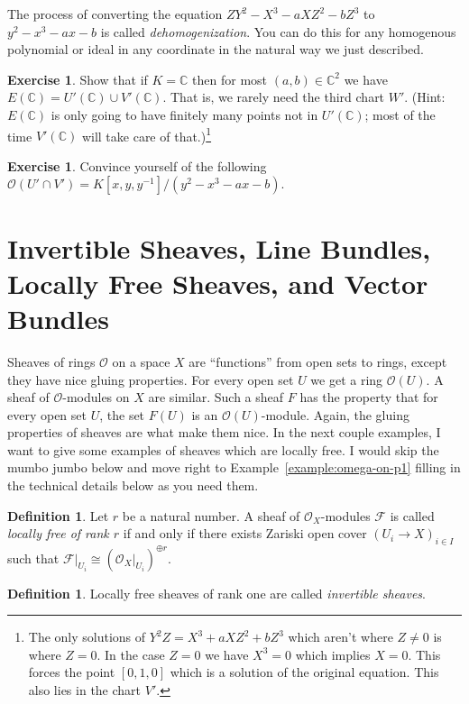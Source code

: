 \documentclass[12pt]{article}
\numberwithin{equation}{section}
\theoremstyle{definition}
\newtheorem{definition}[theorem]{Definition}
\newtheorem{exercise}[theorem]{Exercise}
\theoremstyle{remark}
\newcommand{\CC}{\mathbb{C}}
\newcommand{\Ocal}{\mathcal{O}}
\newcommand{\Fcal}{\mathcal{F}}
\begin{document}
The process of converting the equation 
$ZY^2-X^3-aXZ^2-bZ^3$ to $y^2 -x^3-ax-b$ is called \emph{dehomogenization}.
You can do this for any homogenous polynomial or ideal in any coordinate in the natural way we just described.

\begin{exercise}
	Show that if $K = \CC$ then for most $(a,b) \in \CC^2$ we have $E(\CC)= U'(\CC) \cup V'(\CC)$. That is, we rarely need the third chart $W'$. 
	(Hint: $E(\CC)$ is only going to have finitely many points not in $U'(\CC)$; most of the time $V'(\CC)$ will take care of that.)\footnote{
		The only solutions of $Y^2Z=X^3+aXZ^2+bZ^3$ which aren't where $Z\neq 0$ is where $Z=0$.
		In the case $Z=0$ we have $X^3=0$ which implies $X=0$.
		This forces the point $[0,1,0]$ which is a solution of the original equation.
		This also lies in the chart $V'$.	
}
\end{exercise}

\begin{exercise}
	Convince yourself of the following $\Ocal(U'\cap V')=K[x,y,y^{-1}]/(y^2-x^3-ax-b)$.
\end{exercise}




\section{Invertible Sheaves, Line Bundles, Locally Free Sheaves, and Vector Bundles}
Sheaves of rings $\Ocal$ on a space $X$ are ``functions'' from open sets to rings, except they have nice gluing properties. For every open set $U$ we get a ring $\Ocal(U)$.
A sheaf of $\Ocal$-modules on $X$ are similar. 
Such a sheaf $F$ has the property that for every open set $U$, the set $F(U)$ is an $\Ocal(U)$-module.
Again, the gluing properties of sheaves are what make them nice. 
In the next couple examples, I want to give some examples of sheaves which are locally free. I would skip the mumbo jumbo below and move right to Example~\ref{example:omega-on-p1} filling in the technical details below as you need them. 

\begin{definition}
	Let $r$ be a natural number.
	A sheaf of $\Ocal_X$-modules $\Fcal$ is called \emph{locally free of rank $r$} if and only if there exists Zariski open cover $(U_i \to X)_{i \in I}$ such that $\Fcal\vert_{U_i} \cong (\Ocal_X\vert_{U_i})^{\oplus r}$. 
\end{definition}

\begin{definition}
	Locally free sheaves of rank one are called \emph{invertible sheaves}. 
\end{definition}
\end{document}
